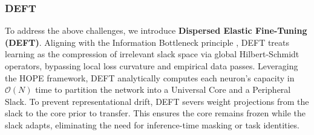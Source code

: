 \documentclass[11pt, a4paper, copyright, gdm]{google}
\newcommand{\calO}{\mathcal{O}}
\theoremstyle{definition}
\begin{document}
\subsubsection{DEFT}

To address the above challenges, we introduce \textbf{Dispersed Elastic Fine-Tuning (DEFT)}. Aligning with the Information Bottleneck principle \cite{tishby1999information}, DEFT treats learning as the compression of irrelevant slack space via global Hilbert-Schmidt operators, bypassing local loss curvature and empirical data passes. Leveraging the HOPE framework, DEFT analytically computes each neuron's capacity in $\calO(N)$ time to partition the network into a Universal Core and a Peripheral Slack. To prevent representational drift, DEFT severs weight projections from the slack to the core prior to transfer. This ensures the core remains frozen while the slack adapts, eliminating the need for inference-time masking or task identities.
\end{document}
